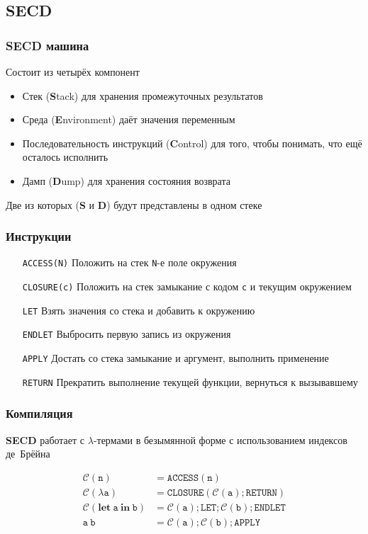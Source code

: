 \subsection{SECD}

\begin{frame}
  \frametitle{SECD машина}
  Состоит из четырёх компонент
  \begin{itemize}
    \item Стек (\textbf{S}tack) для хранения промежуточных результатов
    \item Среда (\textbf{E}nvironment) даёт значения переменным
    \item Последовательность инструкций (\textbf{C}ontrol) для того, чтобы понимать, что ещё осталось исполнить
    \item Дамп (\textbf{D}ump) для хранения состояния возврата
  \end{itemize}
  Две из которых (\textbf{S} и \textbf{D}) будут представлены в одном стеке
\end{frame}



\begin{frame}
  \frametitle{Инструкции}
  \begin{itemize}
    \item[\color{teal}\texttt{ACCESS(N)}] Положить на стек \texttt{N}-е поле окружения
    \item[\color{teal}\texttt{CLOSURE(c)}] Положить на стек замыкание с кодом \texttt{c} и текущим окружением
    \item[\color{teal}\texttt{LET}] Взять значения со стека и добавить к окружению
    \item[\color{teal}\texttt{ENDLET}] Выбросить первую запись из окружения
    \item[\color{teal}\texttt{APPLY}] Достать со стека замыкание и аргумент, выполнить применение
    \item[\color{teal}\texttt{RETURN}] Прекратить выполнение текущей функции, вернуться к
          вызывавшему
  \end{itemize}
\end{frame}

\begin{frame}
  \frametitle{Компиляция}
  \textbf{SECD} работает с $\lambda$-термами в безымянной форме с использованием индексов де~Брёйна
  \begin{wide}
    \begin{align*}
      \mathtt{\mathcal{C}(n)}                                 & = \mathtt{ACCESS(n)}                                  \\
      \mathtt{\mathcal{C}(\lambda a)}                         & = \mathtt{CLOSURE(\mathcal{C}(a); RETURN)}            \\
      \mathtt{\mathcal{C}(\mathbf{let} \ a \ \mathbf{in}\ b)} & = \mathtt{\mathcal{C}(a); LET; \mathcal{C}(b);ENDLET} \\
      \mathtt{a \ b}                                          & = \mathtt{\mathcal{C}(a); \mathcal{C}(b); APPLY}
    \end{align*}
  \end{wide}
\end{frame}

